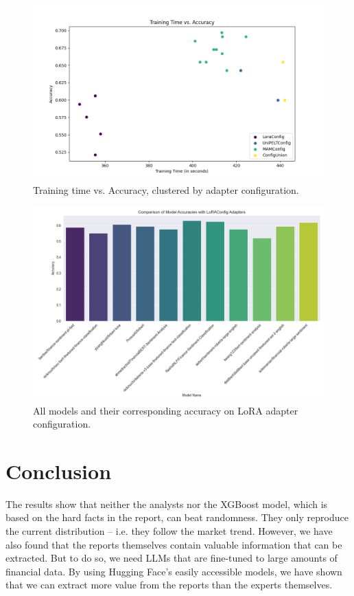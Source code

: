 \documentclass[conference]{IEEEtran}
\begin{document}
\begin{figure}[!h]
    \centering
    \includegraphics[width=.85\linewidth]{pictures/training_time_vs_accuracy.png}
    \caption{Training time vs. Accuracy,  clustered by adapter configuration.}
    \label{fig:time_acc}
\end{figure}

\begin{figure}[!h]
    \centering
    \includegraphics[width=.85\linewidth]{pictures/accuracy_lora.png}
    \caption{All models and their corresponding accuracy on LoRA adapter configuration.}
    \label{fig:models_lora_acc}
\end{figure}

\section{Conclusion}
The results show that neither the analysts nor the XGBoost model, which is based on the hard facts in the report, can beat randomness. They only reproduce the current distribution -- i.e. they follow the market trend. However, we have also found that the reports themselves contain valuable information that can be extracted. But to do so, we need LLMs that are fine-tuned to large amounts of financial data. By using Hugging Face's easily accessible models, we have shown that we can extract more value from the reports than the experts themselves.




\end{document}
